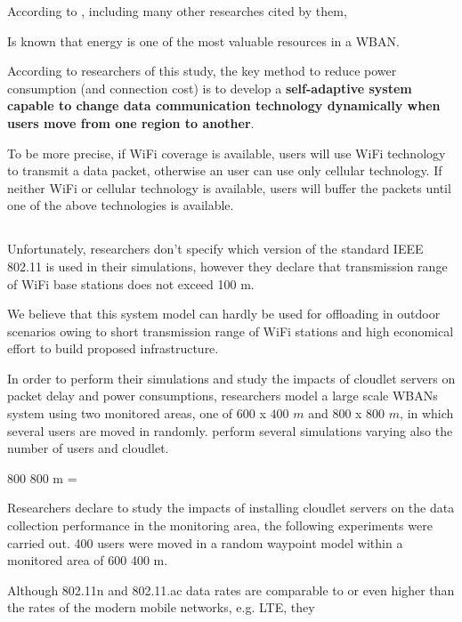 \documentclass[sigchi]{acmart}
\begin{document}
\vspace{0.3cm}

According to \citet{MSAReport}, including many other researches cited by them, 

Is known that energy is one of the most valuable resources in a WBAN.

According to researchers of this study, the key method to reduce power consumption (and connection cost) is to develop a \textbf{self-adaptive system capable to change data communication technology dynamically when users move from one region to another}. 

To be more precise, if WiFi coverage is available, users will use WiFi technology to transmit a data packet, otherwise an user can use only cellular technology. If neither WiFi or cellular technology is available, users will buffer the packets until one of the above technologies is available.\cite[par.~3.1]{MSAReport}


\subsection{}

Unfortunately, researchers don't specify which version of the standard IEEE 802.11 is used in their simulations, however they declare that transmission range of WiFi base stations does not exceed 100 m. 

We believe that this system model can hardly be used for offloading in outdoor scenarios owing to short transmission range of WiFi stations and high economical effort to build proposed infrastructure.



In order to perform their simulations and study the impacts of cloudlet servers on packet delay and power consumptions, researchers model a large scale WBANs system using two monitored areas, one of $600$ x $400$ $m$ and $800$ x $800$ $m$, in which several users are moved in randomly. \citet{MSAReport} perform several simulations varying also the number of users and cloudlet.





 800 800 m = 

Researchers declare to study the impacts of installing cloudlet servers on the data collection performance in the monitoring area, the
following experiments were carried out. 400 users were moved in a random waypoint model within a monitored area of
600 400 m.


Although 802.11n and 802.11.ac data rates are comparable to or
even higher than the rates of the modern mobile networks, e.g. LTE, they
\end{document}
